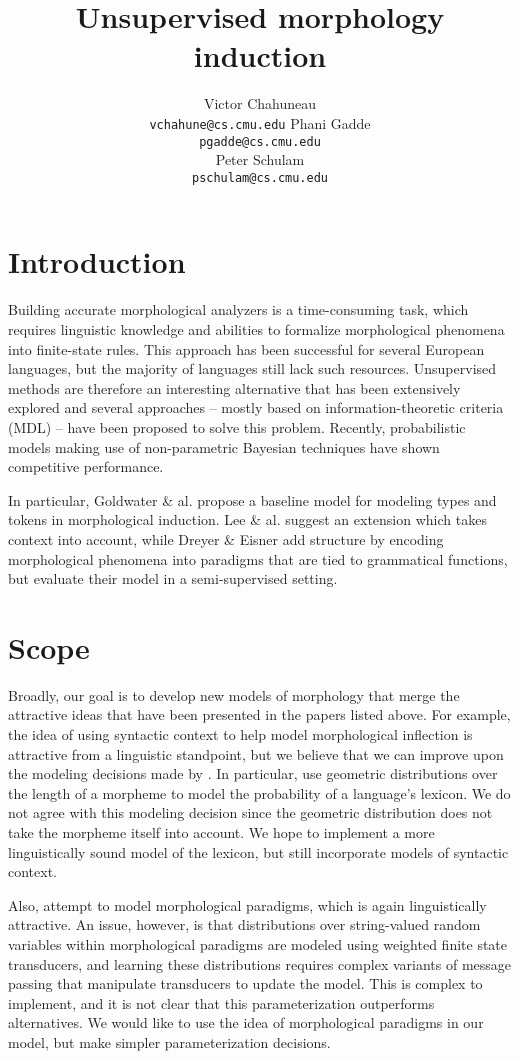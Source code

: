 \documentclass{article}
\title{Unsupervised morphology induction}
\author{
Victor Chahuneau\\
\texttt{vchahune@cs.cmu.edu}
\And
Phani Gadde\\
\texttt{pgadde@cs.cmu.edu} \\
\And
Peter Schulam\\
\texttt{pschulam@cs.cmu.edu}
}
\begin{document}
\maketitle

\section{Introduction}
Building accurate morphological analyzers is a time-consuming task,
which requires linguistic knowledge and abilities to formalize
morphological phenomena into finite-state rules. This approach has
been successful for several European languages, but the majority of
languages still lack such resources. Unsupervised methods are
therefore an interesting alternative that has been extensively
explored and several approaches -- mostly based on
information-theoretic criteria (MDL) -- have been proposed to solve
this problem. Recently, probabilistic models making use of
non-parametric Bayesian techniques have shown competitive performance.

In particular, Goldwater \& al. \cite{goldwater2011} propose a
baseline model for modeling types and tokens in morphological
induction. Lee \& al. \cite{lee2011} suggest an extension which takes
context into account, while Dreyer \& Eisner \cite{dreyer2011} add
structure by encoding morphological phenomena into paradigms that are
tied to grammatical functions, but evaluate their model in a
semi-supervised setting.

\section{Scope}
\label{sec:scope}

Broadly, our goal is to develop new models of morphology that merge
the attractive ideas that have been presented in the papers listed
above. For example, the idea of using syntactic context to help model
morphological inflection is attractive from a linguistic standpoint,
but we believe that we can improve upon the modeling decisions made by
\cite{lee2011}. In particular, \cite{lee2011} use geometric
distributions over the length of a morpheme to model the probability
of a language's lexicon. We do not agree with this modeling decision
since the geometric distribution does not take the morpheme itself
into account. We hope to implement a more linguistically sound model
of the lexicon, but still incorporate models of syntactic context.

Also, \cite{dreyer2011} attempt to model morphological
paradigms, which is again linguistically attractive. An issue,
however, is that distributions over string-valued random variables
within morphological paradigms are modeled using weighted finite state
transducers, and learning these distributions requires complex
variants of message passing that manipulate transducers to update the
model. This is complex to implement, and it is not clear that this
parameterization outperforms alternatives. We would like to use the
idea of morphological paradigms in our model, but make simpler
parameterization decisions.
\end{document}
